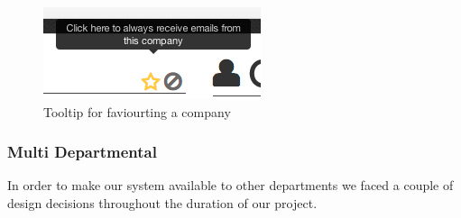     \begin{figure}[H]\centering
    \includegraphics[scale=0.5]{images/design/company_star}
    \caption{Tooltip for faviourting a company}
    \end{figure}

  \subsubsection{Multi Departmental}
    In order to make our system available to other departments we faced a couple of design decisions throughout the duration of our project.
